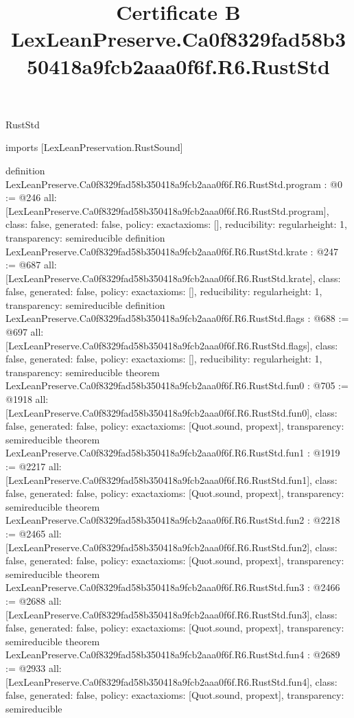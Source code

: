 \begin{lexlean}{RustStd}
\title{Certificate B LexLeanPreserve.Ca0f8329fad58b350418a9fcb2aaa0f6f.R6.RustStd}
\begin{coremodule}
imports [LexLeanPreservation.RustSound]

definition LexLeanPreserve.Ca0f8329fad58b350418a9fcb2aaa0f6f.R6.RustStd.program : @0 := @246 {
  all: [LexLeanPreserve.Ca0f8329fad58b350418a9fcb2aaa0f6f.R6.RustStd.program],
  class: false,
  generated: false,
  policy: exact{axioms: []},
  reducibility: regular{height: 1},
  transparency: semireducible
}
definition LexLeanPreserve.Ca0f8329fad58b350418a9fcb2aaa0f6f.R6.RustStd.krate : @247 := @687 {
  all: [LexLeanPreserve.Ca0f8329fad58b350418a9fcb2aaa0f6f.R6.RustStd.krate],
  class: false,
  generated: false,
  policy: exact{axioms: []},
  reducibility: regular{height: 1},
  transparency: semireducible
}
definition LexLeanPreserve.Ca0f8329fad58b350418a9fcb2aaa0f6f.R6.RustStd.flags : @688 := @697 {
  all: [LexLeanPreserve.Ca0f8329fad58b350418a9fcb2aaa0f6f.R6.RustStd.flags],
  class: false,
  generated: false,
  policy: exact{axioms: []},
  reducibility: regular{height: 1},
  transparency: semireducible
}
theorem LexLeanPreserve.Ca0f8329fad58b350418a9fcb2aaa0f6f.R6.RustStd.fun0 : @705 := @1918 {
  all: [LexLeanPreserve.Ca0f8329fad58b350418a9fcb2aaa0f6f.R6.RustStd.fun0],
  class: false,
  generated: false,
  policy: exact{axioms: [Quot.sound, propext]},
  transparency: semireducible
}
theorem LexLeanPreserve.Ca0f8329fad58b350418a9fcb2aaa0f6f.R6.RustStd.fun1 : @1919 := @2217 {
  all: [LexLeanPreserve.Ca0f8329fad58b350418a9fcb2aaa0f6f.R6.RustStd.fun1],
  class: false,
  generated: false,
  policy: exact{axioms: [Quot.sound, propext]},
  transparency: semireducible
}
theorem LexLeanPreserve.Ca0f8329fad58b350418a9fcb2aaa0f6f.R6.RustStd.fun2 : @2218 := @2465 {
  all: [LexLeanPreserve.Ca0f8329fad58b350418a9fcb2aaa0f6f.R6.RustStd.fun2],
  class: false,
  generated: false,
  policy: exact{axioms: [Quot.sound, propext]},
  transparency: semireducible
}
theorem LexLeanPreserve.Ca0f8329fad58b350418a9fcb2aaa0f6f.R6.RustStd.fun3 : @2466 := @2688 {
  all: [LexLeanPreserve.Ca0f8329fad58b350418a9fcb2aaa0f6f.R6.RustStd.fun3],
  class: false,
  generated: false,
  policy: exact{axioms: [Quot.sound, propext]},
  transparency: semireducible
}
theorem LexLeanPreserve.Ca0f8329fad58b350418a9fcb2aaa0f6f.R6.RustStd.fun4 : @2689 := @2933 {
  all: [LexLeanPreserve.Ca0f8329fad58b350418a9fcb2aaa0f6f.R6.RustStd.fun4],
  class: false,
  generated: false,
  policy: exact{axioms: [Quot.sound, propext]},
  transparency: semireducible
}
\end{coremodule}
\end{lexlean}
